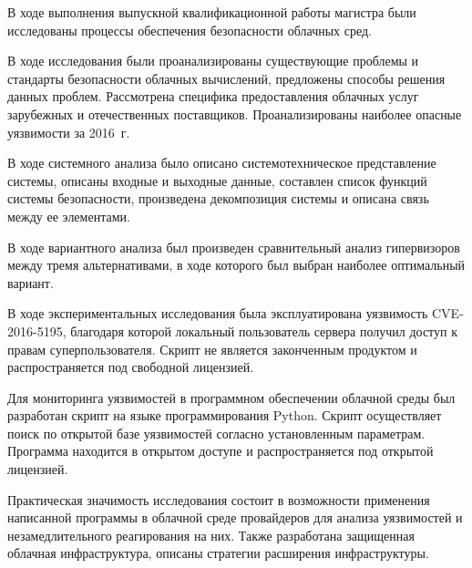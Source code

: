 
В ходе выполнения выпускной квалификационной работы магистра были исследованы процессы обеспечения безопасности облачных сред.

В ходе исследования были проанализированы существующие проблемы и стандарты безопасности облачных вычислений, предложены способы решения данных проблем.
Рассмотрена специфика предоставления облачных услуг зарубежных и отечественных поставщиков.
Проанализированы наиболее опасные уязвимости за 2016~г.

В ходе системного анализа было описано системотехническое представление системы, описаны входные и выходные данные, составлен список функций системы безопасности, произведена декомпозиция системы и описана связь между ее элементами.

В ходе вариантного анализа был произведен сравнительный анализ гипервизоров между тремя альтернативами, в ходе которого был выбран наиболее оптимальный вариант.

В ходе экспериментальных исследования была эксплуатирована уязвимость CVE-2016-5195, благодаря которой локальный пользователь сервера получил доступ к правам суперпользователя.
Скрипт не является законченным продуктом и распространяется под свободной лицензией.

Для мониторинга уязвимостей в программном обеспечении облачной среды был разработан скрипт на языке программирования Python.
Скрипт осуществляет поиск по открытой базе уязвимостей согласно установленным параметрам.
Программа находится в открытом доступе и распространяется под открытой лицензией.

Практическая значимость исследования состоит в возможности применения написанной программы в облачной среде провайдеров для анализа уязвимостей и незамедлительного реагирования на них.
Также разработана защищенная облачная инфраструктура, описаны стратегии расширения инфраструктуры.

\clearpage
